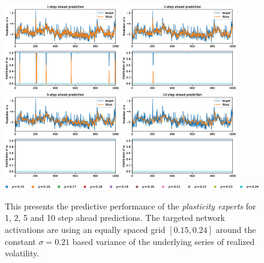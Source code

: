 \begin{figure}[H]
    \begin{center}
        \includegraphics[width=0.45\textwidth]{Plots/Prediction/Plasticity_Grid_Low_rolling_1step.eps}
        \includegraphics[width=0.45\textwidth]{Plots/Prediction/Plasticity_Grid_Low_rolling_2step.eps} \\
        \includegraphics[width=0.45\textwidth]{Plots/Prediction/Plasticity_Grid_Low_rolling_5step.eps}
        \includegraphics[width=0.45\textwidth]{Plots/Prediction/Plasticity_Grid_Low_rolling_10step.eps} \\
        \includegraphics[width=1.0\textwidth]{Plots/Prediction/legend_Grid_Low.eps}
    \end{center}
    \caption{This presents the predictive performance of the \textit{plasticity experts} for 1, 2, 5 and 10 step ahead predictions. The targeted network activations are using an equally spaced grid $\left[0.15, 0.24\right]$ around the constant $\sigma =0.21$ based variance of the underlying series of realized volatility.}
    \label{FIG:PlasticityGridLow}
\end{figure}

